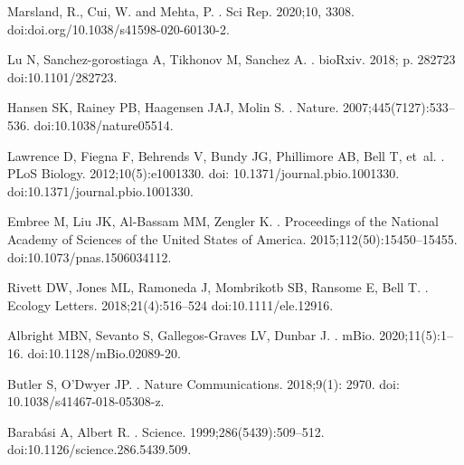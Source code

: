 \documentclass[10pt,letterpaper]{article}
\begin{document}
\begin{thebibliography}{10}
Marsland, R., Cui, W. and Mehta, P.
.
\newblock Sci Rep. 2020;10, 3308. 
\newblock doi:{doi.org/10.1038/s41598-020-60130-2}.

Lu N, Sanchez-gorostiaga A, Tikhonov M, Sanchez A.
.
\newblock bioRxiv. 2018; p. 282723
\newblock doi:{10.1101/282723}.

Hansen SK, Rainey PB, Haagensen JAJ, Molin S.
.
\newblock Nature. 2007;445(7127):533–536.
\newblock doi:{10.1038/nature05514}.

Lawrence D, Fiegna F, Behrends V, Bundy JG, Phillimore AB, Bell T, et~al.
.
\newblock PLoS Biology. 2012;10(5):e1001330. doi: 10.1371/journal.pbio.1001330.
\newblock doi:{10.1371/journal.pbio.1001330}.

Embree M, Liu JK, Al-Bassam MM, Zengler K.
.
\newblock Proceedings of the National Academy of Sciences of the United States of America. 2015;112(50):15450–15455.
\newblock doi:{10.1073/pnas.1506034112}.

Rivett DW, Jones ML, Ramoneda J, Mombrikotb SB, Ransome E, Bell T.
.
\newblock Ecology Letters. 2018;21(4):516--524
\newblock doi:{10.1111/ele.12916}.

Albright MBN, Sevanto S, Gallegos-Graves LV, Dunbar J.
.
\newblock mBio. 2020;11(5):1--16.
\newblock doi:{10.1128/mBio.02089-20}.

Butler S, O’Dwyer JP.
.
\newblock Nature Communications. 2018;9(1): 2970.
\newblock doi: {10.1038/s41467-018-05308-z}.

Barabási A, Albert R.
.
\newblock Science. 1999;286(5439):509--512.
\newblock doi:{10.1126/science.286.5439.509}.


\end{thebibliography}
\end{document}
